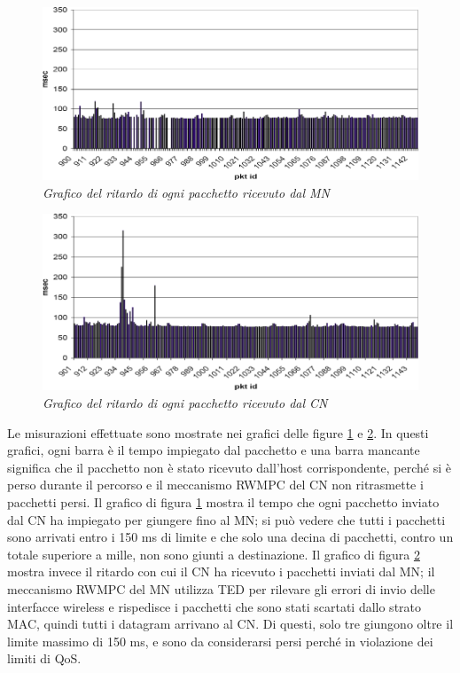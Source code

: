 \documentclass[12pt,a4paper,openright,twoside]{book}
\begin{document}
\begin{figure}
  \centering
  \includegraphics[width=\textwidth]{img/abps-delay-mn}
  \caption{\em Grafico del ritardo di ogni pacchetto ricevuto dal MN}
  \label{fig:abps:delay-mn}
\end{figure}

\begin{figure}
  \centering
  \includegraphics[width=\textwidth]{img/abps-delay-cn}
  \caption{\em Grafico del ritardo di ogni pacchetto ricevuto dal CN}
  \label{fig:abps:delay-cn}
\end{figure}

Le misurazioni effettuate sono mostrate nei grafici delle figure
\ref{fig:abps:delay-mn} e \ref{fig:abps:delay-cn}. In questi grafici,
ogni barra è il tempo impiegato dal pacchetto e una barra mancante
significa che il pacchetto non è stato ricevuto dall'host
corrispondente, perché si è perso durante il percorso e il meccanismo
RWMPC del CN non ritrasmette i pacchetti persi. Il grafico di figura
\ref{fig:abps:delay-mn} mostra il tempo che ogni pacchetto inviato dal
CN ha impiegato per giungere fino al MN; si può vedere che tutti i
pacchetti sono arrivati entro i 150 ms di limite e che solo una decina
di pacchetti, contro un totale superiore a mille, non sono giunti a
destinazione. Il grafico di figura \ref{fig:abps:delay-cn} mostra
invece il ritardo con cui il CN ha ricevuto i pacchetti inviati dal
MN; il meccanismo RWMPC del MN utilizza TED per rilevare gli errori di
invio delle interfacce wireless e rispedisce i pacchetti che sono
stati scartati dallo strato MAC, quindi tutti i datagram arrivano al
CN. Di questi, solo tre giungono oltre il limite massimo di 150 ms, e
sono da considerarsi persi perché in violazione dei limiti di QoS.
\end{document}
